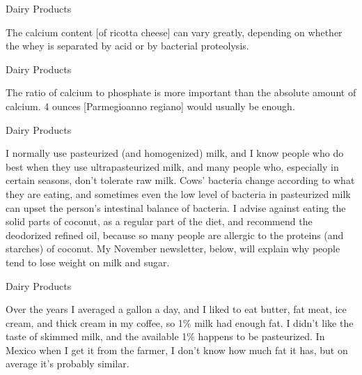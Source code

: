\documentclass[11pt,oneside,openany,extrafontsizes]{memoir}
\begin{document}
\begin{standalonequote}{Dairy Products}

    \begin{answer}
        The calcium content [of ricotta cheese] can vary greatly, depending on whether the whey is separated by acid or by bacterial proteolysis.
    \end{answer}
\end{standalonequote}

\begin{standalonequote}{Dairy Products}

    \begin{answer}
        The ratio of calcium to phosphate is more important than the absolute amount of calcium. 4 ounces [Parmegioanno regiano] would usually be enough.
    \end{answer}
\end{standalonequote}

\begin{standalonequote}{Dairy Products}

    \begin{answer}
        I normally use pasteurized (and homogenized) milk, and I know people who do best when they use ultrapasteurized milk, and many people who, especially in certain seasons, don't tolerate raw milk. Cows' bacteria change according to what they are eating, and sometimes even the low level of bacteria in pasteurized milk can upset the person's intestinal balance of bacteria. I advise against eating the solid parts of coconut, as a regular part of the diet, and recommend the deodorized refined oil, because so many people are allergic to the proteins (and starches) of coconut. My November newsletter, below, will explain why people tend to lose weight on milk and sugar.
    \end{answer}
\end{standalonequote}

\begin{standalonequote}{Dairy Products}

    \begin{answer}
        Over the years I averaged a gallon a day, and I liked to eat butter, fat meat, ice cream, and thick cream in my coffee, so 1\% milk had enough fat. I didn't like the taste of skimmed milk, and the available 1\% happens to be pasteurized. In Mexico when I get it from the farmer, I don't know how much fat it has, but on average it's probably similar.
    \end{answer}
\end{standalonequote}
\end{document}
